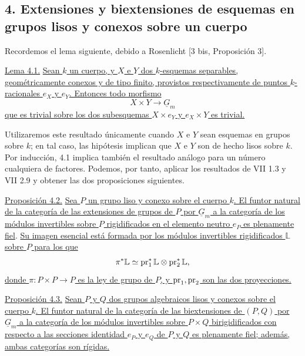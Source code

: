 
\subsection*{4. Extensiones y biextensiones de esquemas en grupos
lisos y conexos sobre un cuerpo}

Recordemos el lema siguiente, debido a Rosenlicht [3 bis, Proposición
3].

\medskip
\noindent\underline{Lema 4.1.} \underline{Sean $k$ un cuerpo, y $X$
e $Y$ dos $k$-esquemas separables, geométricamente conexos y de tipo
finito, provistos respectivamente de puntos $k$-racionales $e_X$ y
$e_Y$. Entonces todo morfismo}
\[
 X\times Y\longrightarrow\underline G_m
\]
\underline{que es trivial sobre los dos subesquemas $X\times e_Y$ y
$e_X\times Y$ es trivial.}

Utilizaremos este resultado únicamente cuando $X$ e $Y$ sean esquemas
en grupos sobre $k$; en tal caso, las hipótesis implican que $X$ e $Y$
son de hecho lisos sobre $k$. Por inducción, 4.1 implica también el
resultado análogo para un número cualquiera de factores. Podemos, por
tanto, aplicar los resultados de VII 1.3 y VII 2.9 y obtener las dos
proposiciones siguientes.

\medskip
\noindent\underline{Proposición 4.2.} \underline{Sea $P$ un grupo
liso y conexo sobre el cuerpo $k$. El funtor natural de la categoría
de las extensiones de grupos de $P$ por $\underline G_m$ a la categoría
de los módulos invertibles sobre $P$ rigidificados en el elemento
neutro $e_P$ es plenamente fiel}. \underline{Su imagen esencial está formada por
los módulos invertibles rigidificados $\mathbb L$ sobre $P$ para los
que}
\[
 \pi^*\sisi{P}{\mathbb L}\simeq
 \pr_1^*\sisi{P}{\mathbb L}\sisi{}{\otimes}
 \pr_2^*\sisi{P}{\mathbb L},
\]
\underline{donde $\pi:P\times P\longrightarrow P$ es la ley de grupo
de $P$, y $\pr_1,\pr_2$ son las dos proyecciones.}

\medskip
\noindent\underline{Proposición 4.3.} \underline{Sean $P$ y $Q$ dos
grupos algebraicos lisos y conexos sobre el cuerpo $k$. El funtor
natural de la categoría de las biextensiones de $(P,Q)$ por
$\underline G_m$ a la categoría de los módulos invertibles sobre
$P\times Q$ birigidificados con respecto a las secciones identidad
$e_P$ y $e_Q$ de $P$ y $Q$ es plenamente fiel; además, ambas
categorías son rígidas.}


